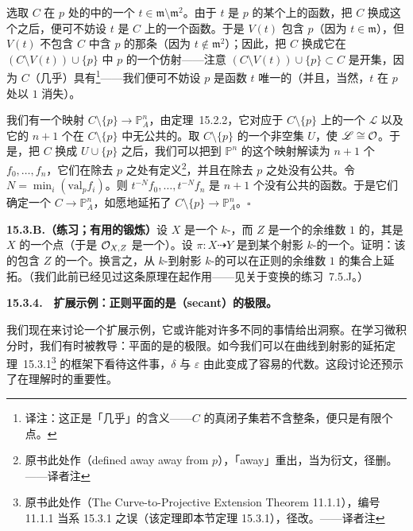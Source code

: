 选取 $C$ 在 $p$ 处的\trLocalRing{}中的一个\trUniformizer{} $t\in\mathfrak{m}\setminus\mathfrak{m}^2$。由于 $t$ 是 $p$ 的某个\trNeighborhood{}上的函数，把 $C$ 换成这个\trNeighborhood{}之后，便可不妨设 $t$ 是 $C$ 上的一个函数。于是 $V(t)$ 包含 $p$（因为 $t\in\mathfrak{m}$），但 $V(t)$ 不包含 $C$ 中含 $p$ 的那条\trIrreducibleComponent（因为 $t\notin\mathfrak{m}^2$）；因此，把 $C$ 换成它在 $(C\setminus V(t))\cup\{p\}$ 中 $p$ 的一个仿射\trOpen\trNeighborhood——注意 $(C\setminus V(t))\cup\{p\}\subset C$ 是开集，因为 $C$（几乎）具有\trCofiniteTopology\footnote{译注：这正是「几乎」的含义——$C$ 的真闭子集若不含整条\trIrreducibleComponent，便只是有限个点。}——我们便可不妨设 $p$ 是函数 $t$ 唯一的\trZeros（并且，当然，$t$ 在 $p$ 处以\trMultiplicity{} $1$ 消失）。

我们有一个映射 $C\setminus\{p\}\to\mathbb{P}^n_A$，由\mbox{定理~15.2.2}，它对应于 $C\setminus\{p\}$ 上的一个\trLineBundle{} $\mathscr{L}$ 以及它的 $n+1$ 个在 $C\setminus\{p\}$ 中无公共\trZeros{}的\trSection。取 $C\setminus\{p\}$ 的一个非空\trOpen{}集 $U$，使 $\mathscr{L}\cong\mathcal{O}$。于是，把 $C$ 换成 $U\cup\{p\}$ 之后，我们可以把到 $\mathbb{P}^n$ 的这个映射解读为 $n+1$ 个\emph{\trRationalFunction} $f_0,\dots,f_n$，它们在除去 $p$ 之处有定义\footnote{原书此处作（defined away away from $p$），「away」重出，当为衍文，径删。——译者注}，并且在除去 $p$ 之处没有公共\trZeros。令 $N=\min_i(\mathrm{val}_p f_i)$。则 $t^{-N}f_0,\dots,t^{-N}f_n$ 是 $n+1$ 个没有公共\trZeros{}的函数。于是它们确定一个\trMorphism{} $C\to\mathbb{P}^n_A$，如愿地延拓了 $C\setminus\{p\}\to\mathbb{P}^n_A$。\hfill$\square$

\textbf{15.3.B.（练习；有用的锻炼）}\quad 设 $X$ 是一个\trNoetherian{} $k$-\trScheme，而 $Z$ 是一个\trIrreducible{}的余维数 $1$ 的\trSubvariety，其\trGenericPoint{}是 $X$ 的一个\trRegular{}点（于是\trLocalRing{} $\mathcal{O}_{X,Z}$ 是一个\trDVR）。设 $\pi\colon X\dashrightarrow Y$ 是到某个射影 $k$-\trScheme{}的一个\trRationalMap。证明：该\trRationalMap{}的\trDomainOfDefinition{}包含 $Z$ 的一个\trDense\trOpenSubset。换言之，从\trNoetherian{} $k$-\trScheme{}到射影 $k$-\trScheme{}的\trRationalMap{}可以在正则的余维数 $1$ 的集合上延拓。（我们此前已经见过这条原理在起作用——见关于\trCremona{}变换的\mbox{练习~7.5.J}。）

\textbf{15.3.4.}\ \hard\ \textbf{扩展示例：正则平面\trCurve{}的\trTangentLine{}是\trSecant（secant）的极限。}

我们现在来讨论一个扩展示例，它或许能对许多不同的事情给出洞察。在学习微积分时，我们有时被教导：平面\trCurve{}的\trTangentLine{}是\trSecant{}的极限。如今我们可以在\mbox{曲线到射影的延拓定理~15.3.1}\footnote{原书此处作（The Curve-to-Projective Extension Theorem 11.1.1），编号 11.1.1 当系 15.3.1 之误（该定理即本节定理 15.3.1），径改。——译者注} 的框架下看待这件事，$\delta$ 与 $\varepsilon$ 由此变成了容易的代数。这段讨论还预示了\trDiagonalMorphism{}在理解\trDifferential{}时的重要性。

